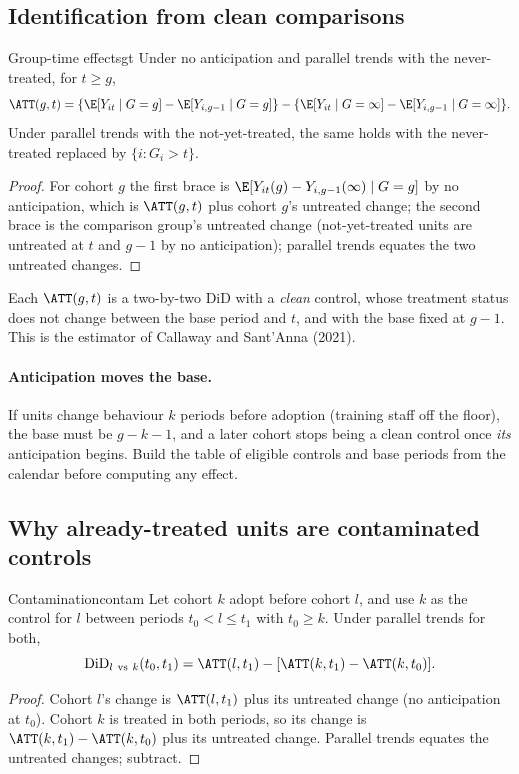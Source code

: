 \documentclass[11pt]{article}
\begin{document}
\subsection{Identification from clean comparisons}

\begin{prop}{Group-time effects}{gt}
Under no anticipation and parallel trends with the never-treated, for $t \ge g$,
\[
  \ATT(g, t) = \{\E[Y_{it} \mid G=g] - \E[Y_{i,g-1} \mid G=g]\} - \{\E[Y_{it} \mid G=\infty] - \E[Y_{i,g-1} \mid G=\infty]\}.
\]
Under parallel trends with the not-yet-treated, the same holds with the never-treated replaced by $\{i : G_i > t\}$.
\end{prop}
\begin{proof}
For cohort $g$ the first brace is $\E[Y_{it}(g) - Y_{i,g-1}(\infty) \mid G=g]$ by no anticipation, which is $\ATT(g,t)$ plus cohort $g$'s untreated change; the
second brace is the comparison group's untreated change (not-yet-treated units are untreated at $t$ and $g - 1$ by no anticipation); parallel trends
equates the two untreated changes.
\end{proof}

Each $\ATT(g,t)$ is a two-by-two DiD with a \emph{clean} control, whose treatment status does not change between the base period and $t$, and with the
base fixed at $g - 1$. This is the estimator of Callaway and Sant'Anna (2021).

\paragraph{Anticipation moves the base.} If units change behaviour $k$ periods before adoption (training staff off the floor), the base must be $g - k - 1$,
and a later cohort stops being a clean control once \emph{its} anticipation begins. Build the table of eligible controls and base periods from the calendar
before computing any effect.

\subsection{Why already-treated units are contaminated controls}

\begin{prop}{Contamination}{contam}
Let cohort $k$ adopt before cohort $l$, and use $k$ as the control for $l$ between periods $t_0 < l \le t_1$ with $t_0 \ge k$. Under parallel trends for both,
\[
  \text{DiD}_{l\ \text{vs}\ k}(t_0, t_1) = \ATT(l, t_1) - [\ATT(k, t_1) - \ATT(k, t_0)].
\]
\end{prop}
\begin{proof}
Cohort $l$'s change is $\ATT(l, t_1)$ plus its untreated change (no anticipation at $t_0$). Cohort $k$ is treated in both periods, so its change is
$\ATT(k,t_1) - \ATT(k,t_0)$ plus its untreated change. Parallel trends equates the untreated changes; subtract.
\end{proof}
\end{document}
